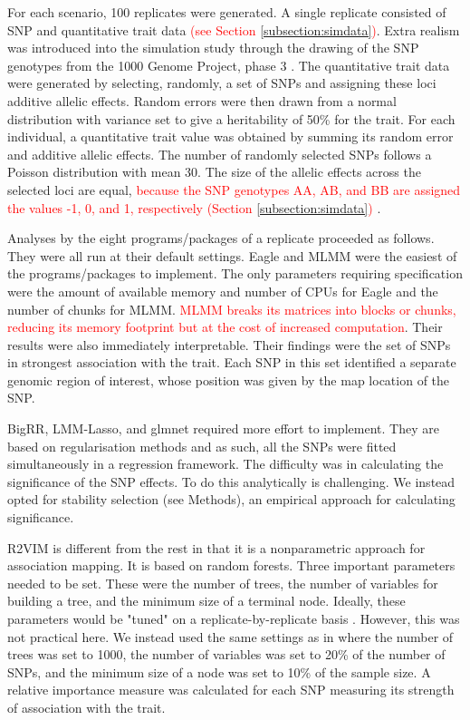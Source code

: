 \documentclass{article}
\begin{document}
For each scenario, 100 replicates were generated. A single replicate consisted of SNP and quantitative trait data \textcolor{red}{(see Section 
\ref{subsection:simdata})}. 
Extra realism was introduced into the simulation study through the drawing of the SNP genotypes from the 1000 Genome Project, phase 3  \citep{10002010map}.
 The quantitative trait data were generated 
by selecting, randomly, a set of SNPs and assigning these loci additive allelic effects.  Random errors were then drawn from a normal distribution 
with variance set to give a heritability of 50\% for the trait. 
For each individual, a quantitative trait value was obtained by summing its random error and additive allelic effects. 
The number of randomly selected SNPs follows a Poisson distribution with mean 30. The size of the allelic effects 
 across the selected loci are equal, \textcolor{red}{because the SNP genotypes AA, AB, and BB 
are assigned the values -1, 0, and 1, respectively (Section \ref{subsection:simdata})} . 
 
  
 
 Analyses by the eight programs/packages of a replicate proceeded as follows. They were all run at their default settings. 
 Eagle and MLMM were the easiest of the programs/packages to implement. 
 The only parameters requiring specification were the amount of available memory and number of CPUs for 
 Eagle and the number of chunks for MLMM.  \textcolor{red}{MLMM breaks its matrices into blocks or chunks, 
 reducing its memory 
 footprint but at the cost of increased computation}.  Their results were also immediately 
 interpretable. Their findings were the set of SNPs in strongest association with the trait. Each 
SNP in this set identified a separate genomic region of interest, whose position was given by the map location of the SNP.  

BigRR, LMM-Lasso, and glmnet required more effort to implement. They are based on regularisation methods and as such, all the SNPs were fitted simultaneously in a regression 
framework. The difficulty was in calculating the significance of the SNP effects. To do this analytically is challenging. We instead opted for stability selection (see Methods),  
an empirical approach for calculating significance. 

R2VIM is different from the rest in that it is a nonparametric approach for association mapping. It is based on random forests. Three important parameters needed to be  set. 
These were the number of trees, the number of variables for building a tree, and the minimum size of a terminal node. Ideally, these parameters would be "tuned" on a replicate-by-replicate 
basis \citep{boulesteix2012overview}. However, this was not practical here. We instead used the same settings as in \citep{szymczak2016r2vim} where 
the number of trees was set to 1000, the number of variables was set to 20\% of the number of SNPs, and 
  the minimum size of a node was set to 10\% of the sample size.
A relative importance measure was calculated 
for each SNP measuring its strength of association with the trait.
\end{document}

